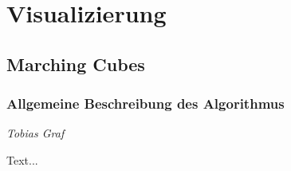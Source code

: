\chapter{Visualizierung}
\thispagestyle{empty}

\section{Marching Cubes}
\subsection{Allgemeine Beschreibung des Algorithmus}

\begin{center}
\emph{{\small Tobias Graf}}
\end{center}

\bigskip

Text...
